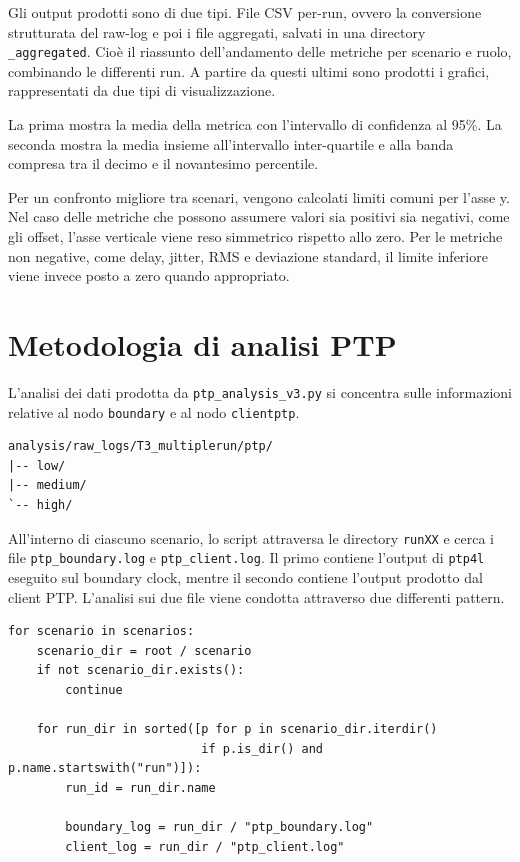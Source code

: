 Gli output prodotti sono di due tipi. File CSV per-run, ovvero la conversione
strutturata del raw-log e poi i file aggregati, salvati in una
directory \texttt{\_aggregated}. Cioè il riassunto dell'andamento delle
metriche per scenario e ruolo, combinando le differenti run. A partire da 
questi ultimi sono prodotti i grafici, rappresentati da due tipi di visualizzazione. 

La prima mostra la media della metrica con l'intervallo di confidenza al 95\%. 
La seconda mostra la media insieme all'intervallo inter-quartile e alla banda 
compresa tra il decimo e il novantesimo percentile.

Per un confronto migliore tra scenari, vengono calcolati limiti comuni per l'asse y.
Nel caso delle metriche che possono assumere valori sia positivi sia negativi,
come gli offset, l'asse verticale viene reso simmetrico rispetto allo zero.
Per le metriche non negative, come delay, jitter, RMS e deviazione standard,
il limite inferiore viene invece posto a zero quando appropriato.

\section{Metodologia di analisi PTP}

L'analisi dei dati prodotta da \texttt{ptp\_analysis\_v3.py} si concentra sulle
informazioni relative al nodo \texttt{boundary} e al nodo \texttt{clientptp}.

\begin{listing}[H]
\begin{verbatim}
analysis/raw_logs/T3_multiplerun/ptp/
|-- low/
|-- medium/
`-- high/
\end{verbatim}
\caption{Struttura di input utilizzata dal parser PTP.}
\label{lst:ptp-input-structure}
\end{listing}

All'interno di ciascuno scenario, lo script attraversa le directory
\texttt{runXX} e cerca i file \texttt{ptp\_boundary.log} e
\texttt{ptp\_client.log}. Il primo contiene l'output di \texttt{ptp4l} eseguito
sul boundary clock, mentre il secondo contiene l'output prodotto dal client PTP.
L'analisi sui due file viene condotta attraverso due differenti pattern.

\begin{listing}[H]
\begin{verbatim}
for scenario in scenarios:
    scenario_dir = root / scenario
    if not scenario_dir.exists():
        continue

    for run_dir in sorted([p for p in scenario_dir.iterdir()
                           if p.is_dir() and p.name.startswith("run")]):
        run_id = run_dir.name

        boundary_log = run_dir / "ptp_boundary.log"
        client_log = run_dir / "ptp_client.log"
\end{verbatim}
\caption{Attraversamento delle directory di scenario e run nel parser PTP.}
\label{lst:ptp-directory-walk}
\end{listing}

